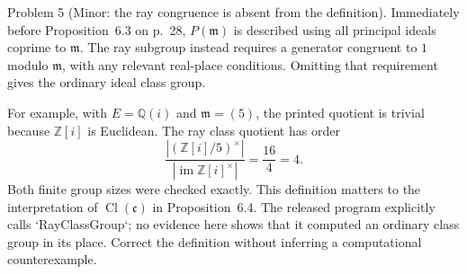 \documentclass[10pt]{article}
\begin{document}
Problem 5 (Minor: the ray congruence is absent from the definition).  Immediately before Proposition 6.3 on p. 28, \(P(\mathfrak m)\) is described using all principal ideals coprime to \(\mathfrak m\). The ray subgroup instead requires a generator congruent to \(1\) modulo \(\mathfrak m\), with any relevant real-place conditions. Omitting that requirement gives the ordinary ideal class group.\par
For example, with \(E=\mathbb{Q}(i)\) and \(\mathfrak m=(5)\), the printed quotient is trivial because \(\mathbb{Z}[i]\) is Euclidean. The ray class quotient has order \[\frac{|(\mathbb{Z}[i]/5)^\times|}{|\operatorname{im}\mathbb{Z}[i]^\times|}
 =\frac{16}{4}=4.\] Both finite group sizes were checked exactly. This definition matters to the interpretation of \(\operatorname{Cl}(\mathfrak c)\) in Proposition 6.4. The released program explicitly calls `RayClassGroup`; no evidence here shows that it computed an ordinary class group in its place. Correct the definition without inferring a computational counterexample.\par
\end{document}
